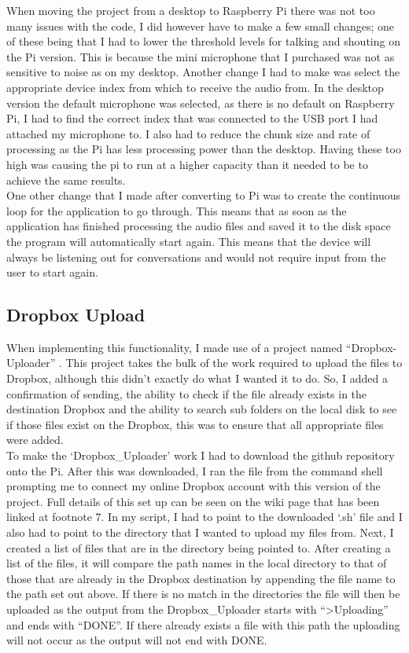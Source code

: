\documentclass[a4paper,11pt]{report}
\begin{document}
When moving the project from a desktop to Raspberry Pi there was not too many issues with the code, I did however have to make a few small changes; one of these being that I had to lower the threshold levels for talking and shouting on the Pi version. This is because the mini microphone that I purchased was not as sensitive to noise as on my desktop. Another change I had to make was select the appropriate device index from which to receive the audio from. In the desktop version the default microphone was selected, as there is no default on Raspberry Pi, I had to find the correct index that was connected to the USB port I had attached my microphone to. I also had to reduce the chunk size and rate of processing as the Pi has less processing power than the desktop. Having these too high was causing the pi to run at a higher capacity than it needed to be to achieve the same results.\\

One other change that I made after converting to Pi was to create the continuous loop for the application to go through. This means that as soon as the application has finished processing the audio files and saved it to the disk space the program will automatically start again. This means that the device will always be listening out for conversations and would not require input from the user to start again.

\subsection{Dropbox Upload}
When implementing this functionality, I made use of a project named “Dropbox-Uploader” . This project takes the bulk of the work required to upload the files to Dropbox, although this didn’t exactly do what I wanted it to do. So, I added a confirmation of sending, the ability to check if the file already exists in the destination Dropbox and the ability to search sub folders on the local disk to see if those files exist on the Dropbox, this was to ensure that all appropriate files were added. \\

To make the ‘Dropbox\_Uploader’ work I had to download the github repository onto the Pi. After this was downloaded, I ran the file from the command shell prompting me to connect my online Dropbox account with this version of the project. Full details of this set up can be seen on the wiki page that has been linked at footnote 7. In my script, I had to point to the downloaded ‘.sh’ file and I also had to point to the directory that I wanted to upload my files from. Next, I created a list of files that are in the directory being pointed to. After creating a list of the files, it will compare the path names in the local directory to that of those that are already in the Dropbox destination by appending the file name to the path set out above. If there is no match in the directories the file will then be uploaded as the output from the Dropbox\_Uploader starts with “>Uploading” and ends with “DONE”. If there already exists a file with this path the uploading will not occur as the output will not end with DONE.\\
\end{document}
